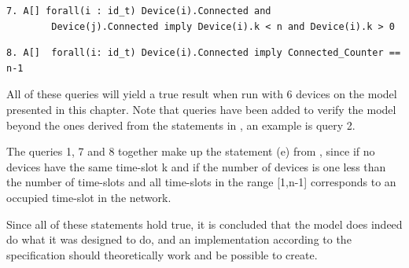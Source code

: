 \begin{lstlisting}[language={[GUI]Uppaal}, % use GUI flavor
columns={[l]flexible},
frameround=fftt, frame=shadowbox, rulesepcolor=\color{gray}, title={This query says that if a device is connected it has a k value between 0 and n, which is the number of time-slots in the frame}]
7. A[] forall(i : id_t) Device(i).Connected and 
	 	Device(j).Connected imply Device(i).k < n and Device(i).k > 0
\end{lstlisting}

\begin{lstlisting}[language={[GUI]Uppaal}, % use GUI flavor
columns={[l]flexible},
frameround=fftt, frame=shadowbox, rulesepcolor=\color{gray}, title={The query asks if a device is connected, is it then true that the number of devices connected to a network is equal to one less the number of time-slots in the frame of a network. }]
8. A[]  forall(i: id_t) Device(i).Connected imply Connected_Counter == n-1
\end{lstlisting}

All of these queries will yield a true result when run with 6 devices on the model presented in this chapter.
Note that queries have been added to verify the model beyond the ones derived from the statements in , an example is query 2.

The queries 1, 7 and 8 together make up the statement (e) from , since if no devices have the same time-slot k and if the number of devices is one less than the number of time-slots and all time-slots in the range [1,n-1] corresponds to an occupied time-slot in the network.

Since all of these statements hold true, it is concluded that the model does indeed do what it was designed to do, and an implementation according to the specification should theoretically work and be possible to create.
